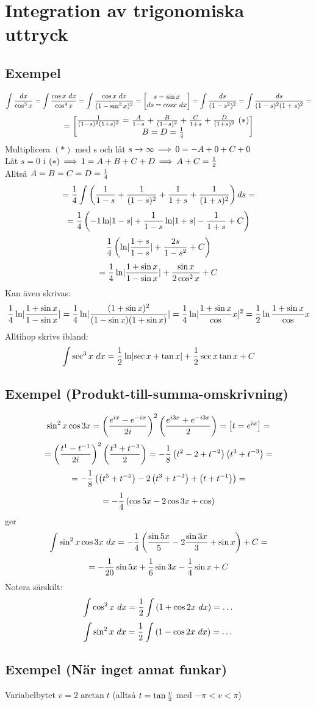 \documentclass{article}
\begin{document}
\section{Integration av trigonomiska uttryck}
\subsection{Exempel}
$$ \int{dx \over \cos^3 x} = \int{\cos x\ dx \over \cos^4 x} = \int{\cos x\ dx \over (1-\sin^2 x)^2}
= \bmat{s=\sin x \\ ds = cos x\ dx} = \int{ds \over (1-s^2)^2} = \int{\f{ds}{(1-s)^2(1+s)^2}}  =$$
$$ =\left[\begin{matrix}\frac{1}{(1-s)^2(1+s)^2} = \frac{A}{1-s}+\frac{B}{(1-s)^2} + \frac{C}{1+s} + \frac{D}{(1+s)^2}\ (*) \\
B=D=\frac{1}{4}\end{matrix}\right] $$
Multiplicera $(*)$ med s och låt $s\to\infty \operatorname{\implies} 0 = -A+0+C+0$\\
Låt $s=0$ i $(*) \operatorname{\implies} 1 = A+B+C+D \operatorname{\implies} A+C=\frac{1}{2}$\\
Alltså $A=B=C=D=\frac{1}{4}$
$$ = \frac{1}{4} \int{\left(\frac{1}{1-s} + \frac{1}{(1-s)^2} + \frac{1}{1+s} + \frac{1}{(1+s)^2} \right) ds } =$$
$$ = \frac{1}{4} \left(-1\ln\lvert1-s\rvert + \frac{1}{1-s} \ln\lvert1+s\rvert - \frac{1}{1+s} +C \right) $$
$$ \frac{1}{4}\left(\ln\lvert\frac{1+s}{1-s}\rvert + \frac{2s}{1-s^2} + C\right) $$
$$ = \frac{1}{4} \ln\lvert\frac{1+\sin x}{1-\sin x}\rvert + \frac{\sin x}{2\cos^2 x}+ C $$
Kan även skrivas:
$$\frac{1}{4} \ln\lvert\frac{1+\sin x}{1-\sin x}\rvert = \frac{1}{4} \ln \lvert\frac{(1+\sin x)^2}{ (1-\sin x) (1+\sin x)}\rvert = \frac{1}{4}\ln\lvert\frac{1+\sin x}{\cos} x\rvert^2 = \frac{1}{2}\ln{\frac{1+\sin x}{\cos} x}$$
Alltihop skrivs ibland:
$$ \int{\sec^3 x\ dx} = \frac{1}{2}\ln\lvert\sec x + \tan x\rvert  + \frac{1}{2}\sec x\tan x + C$$

\subsection{Exempel (Produkt-till-summa-omskrivning)}
$$ \sin^2 x \cos 3x = \left(\frac{e^{ix} - e^{-ix} }{2i} \right)^2 \left(\frac{e^{i3x} + e^{-i3x}}{2}\right) =\left[\begin{matrix}t=e^{ix}\end{matrix}\right] =$$
$$ =\left(\frac{t^1-t^{-1}}{2i}\right)^2 \left(\frac{t^3 + t^{-3}}{2}\right) = -\frac{1}{8}\left(t^2-2+t^{-2}\right)\left(t^3+t^{-3}\right) =$$
$$=-\frac{1}{8}\left(\left(t^5+t^{-5}\right)-2\left(t^3+t^{-3}\right) + \left(t+t^{-1}\right)\right) =$$
$$= -\frac{1}{4}\left(\cos 5x - 2\cos 3x + \cos\right) $$
ger
$$ \int{\sin^2 x\cos 3x\ dx} = -\frac{1}{4}\left(\frac{\sin 5x}{5} - 2 \frac{\sin 3x}{3} +\sin x\right)+C =$$
$$ = -\frac{1}{20} \sin 5x + \frac{1}{6} \sin 3x - \frac{1}{4}\sin x +C $$
Notera särskilt:
$$ \int{\cos^2 x\ dx} = \frac{1}{2} \int{\left(1+\cos 2x\ dx\right)} = \dots$$
$$ \int{\sin^2 x\ dx} = \f12 \int{\pa{1-\cos 2x\ dx}} = \dots$$

\subsection{Exempel (När inget annat funkar)}
Variabelbytet $v=2\arctan t$ (alltså $t=\tan\frac{v}{2}$ med $-\pi < v<\pi$)
\end{document}
